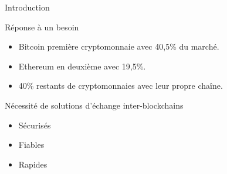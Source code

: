 \begin{frame}{Introduction}
    \begin{block}{Réponse à un besoin}
        \begin{itemize}
        \item Bitcoin première cryptomonnaie avec 40,5\% du marché.
        \item Ethereum en deuxième avec 19,5\%.
        \item 40\% restants de cryptomonnaies avec leur propre chaîne.
    \end{itemize}
    \end{block}
    \pause
    \begin{block}{Nécessité de solutions d'échange inter-blockchains}
        \begin{itemize}
            \item Sécurisés
            \item Fiables
            \item Rapides
        \end{itemize}
    \end{block}
    \end{frame}